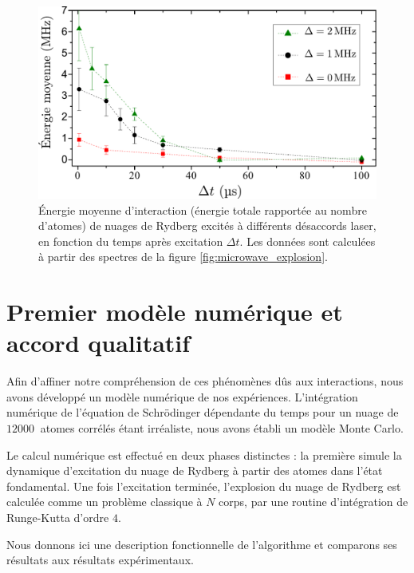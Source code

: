 \begin{figure}[b]
\centering
\includegraphics[width=0.8\linewidth]{figures/low_l/energie_moyenne_explosion}
\caption[Énergie moyenne au cours de l'expansion du nuage]{
Énergie moyenne d'interaction (énergie totale rapportée au nombre d'atomes) de nuages de Rydberg excités à différents désaccords laser, en fonction du temps après excitation $\Delta t$.
Les données sont calculées à partir des spectres de la figure \eqref{fig:microwave_explosion}.
}
\label{fig:avener_explosion}
\end{figure}

\clearpage
\section{Premier modèle numérique et accord qualitatif}
\noindent Afin d'affiner notre compréhension de ces phénomènes dûs aux interactions, nous avons développé un modèle numérique de nos expériences.
L'intégration numérique de l'équation de Schrödinger dépendante du temps pour un nuage de $\SI{12000}{}$ atomes corrélés étant irréaliste, nous avons établi un modèle Monte Carlo.

Le calcul numérique est effectué en deux phases distinctes : la première simule la dynamique d'excitation du nuage de Rydberg à partir des atomes dans l'état fondamental.
Une fois l'excitation terminée, l'explosion du nuage de Rydberg est calculée comme un problème classique à $N$ corps, par une routine d'intégration de Runge-Kutta d'ordre $4$.

Nous donnons ici une description fonctionnelle de l'algorithme et comparons ses résultats aux résultats expérimentaux.

